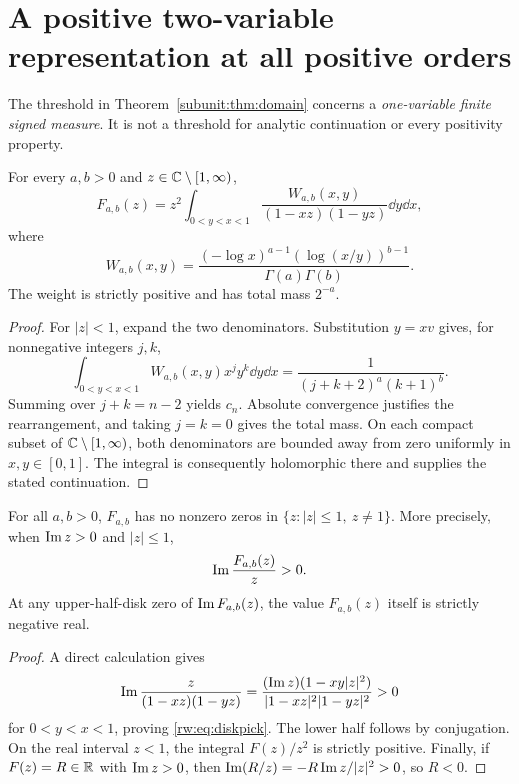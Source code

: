 \section{A positive two-variable representation at all positive orders}
\label{rw:sec:double}

The threshold in Theorem~\ref{subunit:thm:domain} concerns a
\emph{one-variable finite signed measure}. It is not a threshold for
analytic continuation or every positivity property.

\begin{theorem}\label{rw:thm:double}
For every $a,b>0$ and $z\in\mathbb C\setminus[1,\infty)$,
\begin{equation}\label{rw:eq:double}
 F_{a,b}(z)=z^2\int_{0<y<x<1}
 \frac{W_{a,b}(x,y)}{(1-xz)(1-yz)}\dd y\dd x,
\end{equation}
where
\begin{equation}\label{rw:eq:W}
 W_{a,b}(x,y)=\frac{(-\log x)^{a-1}(\log(x/y))^{b-1}}
 {\Gamma(a)\Gamma(b)}.
\end{equation}
The weight is strictly positive and has total mass $2^{-a}$.
\end{theorem}
\begin{proof}
For $|z|<1$, expand the two denominators. Substitution $y=xv$
gives, for nonnegative integers $j,k$,
\[
 \int_{0<y<x<1}W_{a,b}(x,y)x^jy^k\dd y\dd x
 =\frac1{(j+k+2)^a(k+1)^b}.
\]
Summing over $j+k=n-2$ yields $c_n$. Absolute convergence justifies
the rearrangement, and taking $j=k=0$ gives the total mass.
On each compact subset of $\mathbb C\setminus[1,\infty)$, both denominators are bounded
away from zero uniformly in $x,y\in[0,1]$. The integral is consequently
holomorphic there and supplies the stated continuation.
\end{proof}

\begin{corollary}
\label{rw:cor:disk}
For all $a,b>0$, $F_{a,b}$ has no nonzero zeros in
$\{z:|z|\le1,\ z\ne1\}$. More precisely, when $\operatorname{Im} z>0$ and
$|z|\le1$,
\begin{equation}\label{rw:eq:diskpick}
 \operatorname{Im}\frac{F_{a,b}(z)}z>0.
\end{equation}
At any upper-half-disk zero of $\operatorname{Im} F_{a,b}(z)$, the value
$F_{a,b}(z)$ itself is strictly negative real.
\end{corollary}
\begin{proof}
A direct calculation gives
\[
 \operatorname{Im}\frac{z}{(1-xz)(1-yz)}
 =\frac{(\operatorname{Im} z)(1-xy|z|^2)}{|1-xz|^2|1-yz|^2}>0
\]
for $0<y<x<1$, proving \eqref{rw:eq:diskpick}. The lower half follows
by conjugation. On the real interval $z<1$, the integral
$F(z)/z^2$ is strictly positive. Finally, if $F(z)=R\in\mathbb R$ with
$\operatorname{Im} z>0$, then $\operatorname{Im}(R/z)=-R\operatorname{Im} z/|z|^2>0$, so $R<0$.
\end{proof}

